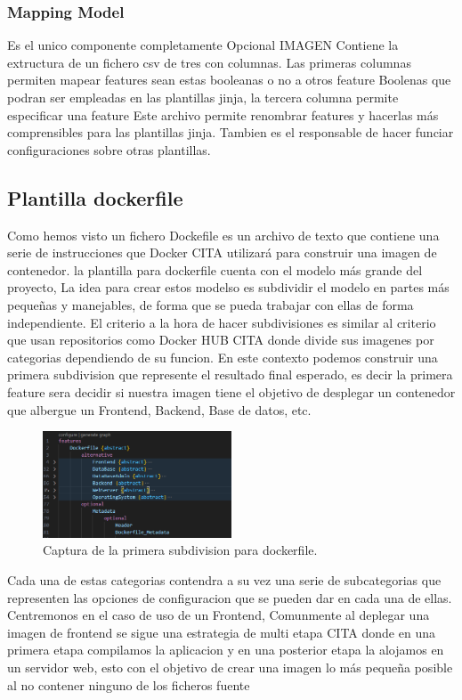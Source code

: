 \documentclass[12pt, a4paper, twoside]{article}
\begin{document}
\subsubsection{Mapping Model}
Es el unico componente completamente Opcional IMAGEN
Contiene la extructura de un fichero csv de tres con columnas. Las primeras columnas permiten mapear features sean estas booleanas o no a otros feature Boolenas que podran ser empleadas en las plantillas jinja, la tercera columna permite especificar una feature
Este archivo permite renombrar features y hacerlas más comprensibles para las plantillas jinja. Tambien es el responsable de hacer funciar configuraciones sobre otras plantillas.
\subsection{Plantilla dockerfile}
Como hemos visto un fichero Dockefile es un archivo de texto que contiene una serie de instrucciones que Docker CITA utilizará para construir una imagen de contenedor.
la plantilla para dockerfile cuenta con el modelo más grande del proyecto, La idea para crear estos modelso es subdividir el modelo en partes más pequeñas y manejables, de forma que se pueda trabajar con ellas de forma independiente.
El criterio a la hora de hacer subdivisiones es similar al criterio que usan repositorios como Docker HUB CITA donde divide sus imagenes por categorias dependiendo de su funcion.
En este contexto podemos construir una primera subdivision que represente el resultado final esperado, es decir la primera feature sera decidir si nuestra imagen 
tiene el objetivo de desplegar un contenedor que albergue un Frontend, Backend, Base de datos, etc.
\begin{figure}[ht]
	\centering
	  \includegraphics[width=0.5\textwidth]{dockerfile.uvl.png}
	\caption{Captura de la primera subdivision para dockerfile.}
\end{figure}

Cada una de estas categorias contendra a su vez una serie de subcategorias que representen las opciones de configuracion que se pueden dar en cada una de ellas.
Centremonos en el caso de uso de un Frontend, Comunmente al deplegar una imagen de frontend se sigue una estrategia de multi etapa CITA donde en una primera etapa compilamos la aplicacion 
y en una posterior etapa la alojamos en un servidor web, esto con el objetivo de crear una imagen lo más pequeña posible al no contener ninguno de los ficheros fuente
\end{document}
